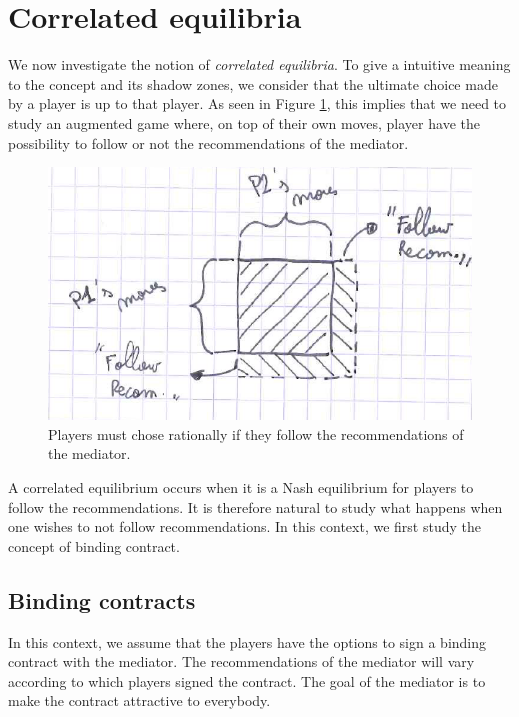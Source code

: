 \section{Correlated equilibria}

We now investigate the notion of \emph{correlated equilibria}.
To give a intuitive meaning to the concept and its shadow zones, we consider that the ultimate choice made by a player is up to that player.
As seen in Figure \ref{figureDrawnByMatt}, this implies that we need to study an augmented game where, on top of their own moves, player have the possibility to follow or not the recommendations of the mediator.

\begin{figure}[!ht]
\centering
\includegraphics[scale=0.5]{drawingMatt.PNG}
\caption{Players must chose rationally if they follow the recommendations of the mediator.}
\label{figureDrawnByMatt}
\end{figure}

A correlated equilibrium occurs when it is a Nash equilibrium for players to follow the recommendations.
It is therefore natural to study what happens when one wishes to not follow recommendations. In this context, we first study the concept of binding contract.

\subsection{Binding contracts}
\label{ch5:sec:cont}

In this context, we assume that the players have the options to sign a binding contract with the mediator. The recommendations of the mediator will vary according to which players signed the contract.
The goal of the mediator is to make the contract attractive to everybody.


